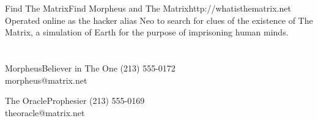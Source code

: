 \documentclass{resume}
\begin{document}
\section*{}

\begin{project}{Find The Matrix}{Find Morpheus and The Matrix}{http://whatisthematrix.net}
	Operated online as the hacker alias Neo to search for clues of the
	existence of The Matrix, a simulation of Earth for the purpose of
	imprisoning human minds.
\end{project}


\section*{}

\begin{reference}{Morpheus}{Believer in The One}
	(213) 555-0172\\
	morpheus@matrix.net
\end{reference}

\begin{reference}{The Oracle}{Prophesier}
	(213) 555-0169\\
	theoracle@matrix.net
\end{reference}
\end{document}
